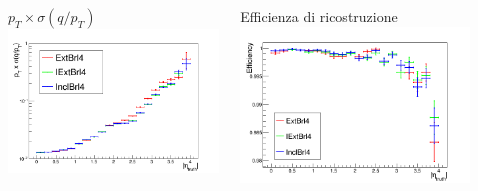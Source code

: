 \documentclass{beamer}
\begin{document}
\begin{frame}
\begin{columns}
\begin{column}{.09\textwidth}
\end{column}
\begin{column}{.41\textwidth}
\centering
$p_{T} \times \sigma(q/p_{T})$
\includegraphics[width=\textwidth]{HZZ4mu/sigQPt_abseta}
\end{column}
\begin{column}{.41\textwidth}
\centering
Efficienza di ricostruzione
\includegraphics[width=\textwidth]{HZZ4mu/eff_abseta}
\end{column}
\begin{column}{.09\textwidth}
\end{column}
\end{columns}


\end{frame}
\end{document}
